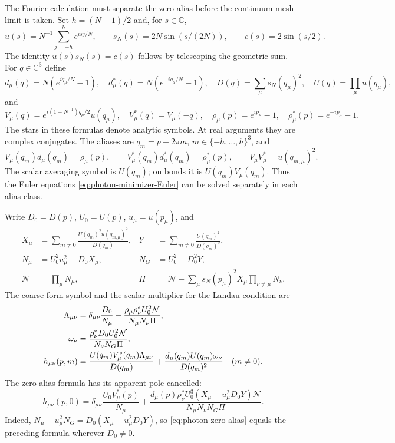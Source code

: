\documentclass[11pt,letterpaper,reqno]{amsart}
\newcommand{\C}{\mathbb C}
\begin{document}
The Fourier calculation must separate the zero alias before the
continuum mesh limit is taken. Set $h=(N-1)/2$ and, for $s\in\C$,
\[
 u(s)=N^{-1}\sum_{j=-h}^he^{isj/N},\qquad
 s_N(s)=2N\sin(s/(2N)),\qquad c(s)=2\sin(s/2).
\]
The identity $u(s)s_N(s)=c(s)$ follows by telescoping the geometric
sum. For $q\in\C^3$ define
\[
 d_\mu(q)=N(e^{iq_\mu/N}-1),\quad
 d_\mu^*(q)=N(e^{-iq_\mu/N}-1),\quad
 D(q)=\sum_\mu s_N(q_\mu)^2,\quad U(q)=\prod_\mu u(q_\mu),
\]
and
\[
 V_\mu(q)=e^{i(1-N^{-1})q_\mu/2}u(q_\mu),\quad
 V_\mu^*(q)=V_\mu(-q),\quad
 \rho_\mu(p)=e^{ip_\mu}-1,\quad\rho_\mu^*(p)=e^{-ip_\mu}-1.
\]
The stars in these formulas denote analytic symbols. At real arguments
they are complex conjugates. The aliases are $q_m=p+2\pi m$,
$m\in\{-h,\ldots,h\}^3$, and
\begin{equation}\label{eq:photon-alias-identities}
 V_\mu(q_m)d_\mu(q_m)=\rho_\mu(p),\qquad
 V_\mu^*(q_m)d_\mu^*(q_m)=\rho_\mu^*(p),\qquad
 V_\mu V_\mu^*=u(q_{m,\mu})^2.
\end{equation}
The scalar averaging symbol is $U(q_m)$; on bonds it is
$U(q_m)V_\mu(q_m)$. Thus the Euler equations
\eqref{eq:photon-minimizer-Euler} can be solved separately in each
alias class.

Write $D_0=D(p)$, $U_0=U(p)$, $u_\mu=u(p_\mu)$, and
\begin{align*}
 X_\mu&=\sum_{m\ne0}\frac{U(q_m)^2u(q_{m,\mu})^2}{D(q_m)},&
 Y&=\sum_{m\ne0}\frac{U(q_m)^2}{D(q_m)^2},\\
 N_\mu&=U_0^2u_\mu^2+D_0X_\mu,&
 N_G&=U_0^2+D_0^2Y,\\
 \mathcal N&=\prod_\mu N_\mu,&
 \Pi&=\mathcal N-\sum_\mu s_N(p_\mu)^2X_\mu
                                      \prod_{\nu\ne\mu}N_\nu.
\end{align*}
The coarse form symbol and the scalar multiplier for the Landau
condition are
\begin{align}
 \Lambda_{\mu\nu}
     &=\delta_{\mu\nu}\frac{D_0}{N_\mu}
       -\frac{\rho_\mu\rho_\nu^*U_0^2\mathcal N}
                    {N_\mu N_\nu\Pi},\notag\\
 \omega_\nu&=\frac{\rho_\nu^*D_0U_0^2\mathcal N}{N_\nu N_G\Pi},
                                                    \label{eq:photon-Lambda-symbol}\\
 h_{\mu\nu}(p,m)
    &=\frac{U(q_m)V_\mu^*(q_m)\Lambda_{\mu\nu}}{D(q_m)}
          +\frac{d_\mu(q_m)U(q_m)\omega_\nu}{D(q_m)^2}
                                      \quad(m\ne0).\notag
\end{align}
The zero-alias formula has its apparent pole cancelled:
\begin{equation}\label{eq:photon-zero-alias}
 h_{\mu\nu}(p,0)=\delta_{\mu\nu}\frac{U_0V_\mu^*(p)}{N_\mu}
       +\frac{d_\mu(p)\rho_\nu^*U_0^3
                 (X_\mu-u_\mu^2D_0Y)\mathcal N}
                  {N_\mu N_\nu N_G\Pi}.
\end{equation}
Indeed, $N_\mu-u_\mu^2N_G=D_0(X_\mu-u_\mu^2D_0Y)$, so
\eqref{eq:photon-zero-alias} equals the preceding formula wherever
$D_0\ne0$.
\end{document}
